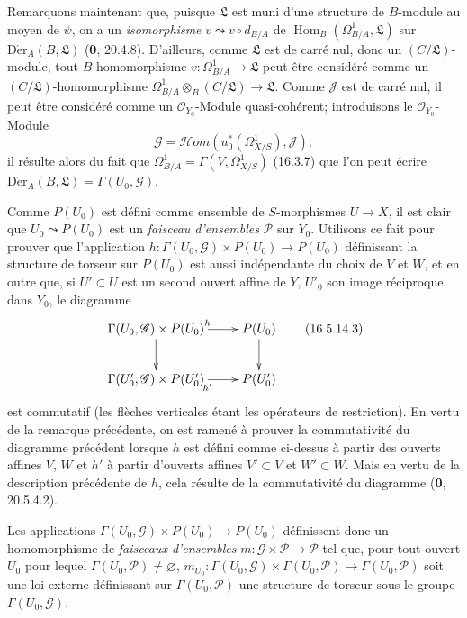 \begin{env}[16.5.14]
Remarquons maintenant que, puisque $\mathfrak{L}$ est muni d'une structure de
$B$-module au moyen de $\psi$, on a un \emph{isomorphisme}
$v\leadsto v\circ d_{B/A}$ de
$\operatorname{Hom}_B(\Omega_{B/A}^1,\mathfrak{L})$ sur
$\operatorname{D\acute{e}r}_A(B,\mathfrak{L})$ (\textbf{0}, 20.4.8). D'ailleurs, comme
$\mathfrak{L}$ est de carré nul, donc un $(C/\mathfrak{L})$-module, tout
$B$-homomorphisme $v:\Omega_{B/A}^1\to\mathfrak{L}$ peut être considéré
comme un $(C/\mathfrak{L})$-homomorphisme
$\Omega_{B/A}^1\otimes_B(C/\mathfrak{L})\to\mathfrak{L}$. Comme
$\mathscr{J}$ est de carré nul, il peut être considéré comme un
$\mathcal{O}_{Y_0}$-Module quasi-cohérent; introduisons le
$\mathcal{O}_{Y_0}$-Module
\[
  \mathscr{G}=\mathscr{H}om(u_0^*(\varOmega_{X/S}^1),\mathscr{J});
  \tag{16.5.14.2}
  \label{IV.16.5.14.2}
\]
il résulte alors du fait que
$\Omega_{B/A}^1=\Gamma(V,\varOmega_{X/S}^1)$ (16.3.7) que l'on peut écrire
$\operatorname{D\acute{e}r}_A(B,\mathfrak{L})=\Gamma(U_0,\mathscr{G})$.

Comme $P(U_0)$ est défini comme ensemble de $S$-morphismes $U\to X$, il est
clair que $U_0\leadsto P(U_0)$ est un \emph{faisceau d'ensembles}
$\mathscr{P}$ sur $Y_0$. Utilisons ce fait pour prouver que l'application
$h:\Gamma(U_0,\mathscr{G})\times P(U_0)\to P(U_0)$
définissant la structure de torseur sur $P(U_0)$ est aussi indépendante du
choix de $V$ et $W$, et en outre que, si $U'\subset U$ est un second ouvert
affine de $Y$, $U'_0$ son image réciproque dans $Y_0$, le diagramme
\[
  \xymatrix{
    \Gamma(U_0,\mathscr{G})\times P(U_0)\ar[d]\ar[r]^h
      & P(U_0)\ar[d]\\
    \Gamma(U'_0,\mathscr{G})\times P(U'_0)\ar[r]_{h'}
      & P(U'_0)
  }
  \tag{16.5.14.3}
  \label{IV.16.5.14.3}
\]
est commutatif (les flèches verticales étant les opérateurs de restriction).
En vertu de la remarque précédente, on est ramené à prouver la commutativité
du diagramme précédent lorsque $h$ est défini comme ci-dessus à partir des
ouverts affines $V$, $W$ et $h'$ à partir d'ouverts
affines $V'\subset V$ et $W'\subset W$. Mais en vertu de la description
précédente de $h$, cela résulte de la commutativité du diagramme (\textbf{0}, 20.5.4.2).

Les applications
$\Gamma(U_0,\mathscr{G})\times P(U_0)\to P(U_0)$ définissent donc un
homomorphisme de \emph{faisceaux d'ensembles}
$m:\mathscr{G}\times\mathscr{P}\to\mathscr{P}$ tel que, pour tout ouvert
$U_0$ pour lequel $\Gamma(U_0,\mathscr{P})\neq\varnothing$,
$m_{U_0}:\Gamma(U_0,\mathscr{G})\times\Gamma(U_0,\mathscr{P})\to\Gamma(U_0,\mathscr{P})$
soit une loi externe définissant sur $\Gamma(U_0,\mathscr{P})$ une structure
de torseur sous le groupe $\Gamma(U_0,\mathscr{G})$.
\end{env}

